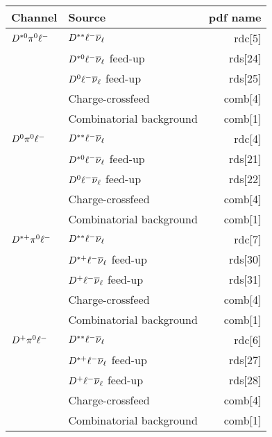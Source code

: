 \documentclass[10pt,twocolumn]{article}
\begin{document}
\begin{tabular}{l l r}\\ \hline\hline
Channel          & Source  & pdf name\\ \hline
$D^{*0}\pi^0\ell^-$ & $D^{**}\ell^-\overline{\nu}_\ell$                & rdc[5] \\
              & $D^{*0}\ell^-\overline{\nu}_\ell$ feed-up            & rds[24] \\
              & $D^0\ell^-\overline{\nu}_\ell$ feed-up                & rds[25] \\
              & Charge-crossfeed                       & comb[4] \\
              & Combinatorial background               & comb[1] \\ \hline
$D^0\pi^0\ell^-$     & $D^{**}\ell^-\overline{\nu}_\ell$                & rdc[4] \\
              & $D^{*0}\ell^-\overline{\nu}_\ell$ feed-up            & rds[21]  \\
              & $D^0\ell^-\overline{\nu}_\ell$ feed-up                & rds[22] \\
              & Charge-crossfeed                       & comb[4] \\
              & Combinatorial background               & comb[1] \\ \hline
$D^{*+}\pi^0\ell^-$ & $D^{**}\ell^-\overline{\nu}_\ell$                & rdc[7] \\
              & $D^{*+}\ell^-\overline{\nu}_\ell$ feed-up            & rds[30] \\
              & $D^+\ell^-\overline{\nu}_\ell$ feed-up                & rds[31]   \\
              & Charge-crossfeed                       & comb[4]   \\
              & Combinatorial background               & comb[1] \\ \hline
$D^+\pi^0\ell^-$     & $D^{**}\ell^-\overline{\nu}_\ell$                & rdc[6] \\
              & $D^{*+}\ell^-\overline{\nu}_\ell$ feed-up            & rds[27] \\
              & $D^+\ell^-\overline{\nu}_\ell$ feed-up                & rds[28] \\
              & Charge-crossfeed                       & comb[4] \\
              & Combinatorial background               & comb[1] \\ \hline\hline
\end{tabular}
\end{document}
